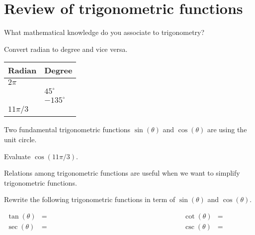\documentclass[../main.tex]{subfiles}
\begin{document}
 \section{Review of trigonometric functions}
\faComments{} What mathematical knowledge do you associate to trigonometry?


\begin{example}
  Convert radian to degree and vice versa. 

  \begin{minipage}{.4\textwidth}
    \begin{tabular}{p{1in} | p{1in}}
      Radian & Degree \\\midrule
      \(2\pi\) & \\[2ex] \midrule
               & \(45^{\circ}\) \\[2ex] \midrule
               & \(-135^{\circ}\) \\[2ex] \midrule
      \(11\pi/3\) & \\[2ex] \midrule
    \end{tabular}
  \end{minipage}
  \begin{minipage}{.59\textwidth}
    
  \end{minipage}
\end{example}

Two fundamental trigonometric functions \(\sin(\theta)\) and \(\cos(\theta)\) are  using the unit circle.



\begin{example}
  Evaluate \(\cos(11\pi/3)\).

  
\end{example}
\clearpage

Relations among trigonometric functions are useful when we want to simplify trigonometric functions. 

\begin{example}
  Rewrite the following trigonometric functions in term of \(\sin(\theta)\) and \(\cos(\theta)\).

  \begin{align*}
    \tan(\theta) &= \hspace{3in} && \cot(\theta) &= \hspace{3in} \\[8ex]
    \sec(\theta) &= \hspace{3in} && \csc(\theta) &= \hspace{3in} \\[5ex]
  \end{align*}

\end{example}
\end{document}
